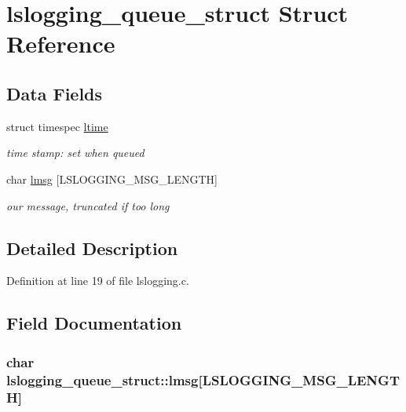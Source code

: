 \hypertarget{structlslogging__queue__struct}{
\section{lslogging\_\-queue\_\-struct Struct Reference}
\label{structlslogging__queue__struct}
}
\subsection*{Data Fields}
\begin{DoxyCompactItemize}
\item 
struct timespec \hyperlink{structlslogging__queue__struct_aa8211878c89f3c98757c3433115453eb}{ltime}
\begin{DoxyCompactList}\small\item\em time stamp: set when queued \item\end{DoxyCompactList}\item 
char \hyperlink{structlslogging__queue__struct_a5e83db0116b1289a84683ce48626d99d}{lmsg} \mbox{[}LSLOGGING\_\-MSG\_\-LENGTH\mbox{]}
\begin{DoxyCompactList}\small\item\em our message, truncated if too long \item\end{DoxyCompactList}\end{DoxyCompactItemize}


\subsection{Detailed Description}


Definition at line 19 of file lslogging.c.

\subsection{Field Documentation}
\hypertarget{structlslogging__queue__struct_a5e83db0116b1289a84683ce48626d99d}{
\subsubsection[{lmsg}]{\setlength{\rightskip}{0pt plus 5cm}char {\bf lslogging\_\-queue\_\-struct::lmsg}\mbox{[}LSLOGGING\_\-MSG\_\-LENGTH\mbox{]}}}
\label{structlslogging__queue__struct_a5e83db0116b1289a84683ce48626d99d}


